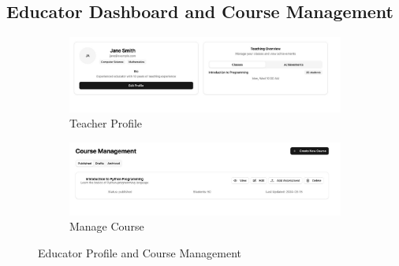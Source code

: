 \documentclass[a4paper, 11pt]{scrreprt}
\begin{document}
\subsection{Educator Dashboard and Course Management}
\begin{figure}[H]
    \centering
    \begin{subfigure}[b]{0.45\textwidth}
        \centering
        \includegraphics[width=\textwidth]{UI/TeacherProfile.jpg}
        \caption{Teacher Profile}
    \end{subfigure}
    \hfill
    \begin{subfigure}[b]{0.45\textwidth}
        \centering
        \includegraphics[width=\textwidth]{UI/TeacherManageCourse.jpg}
        \caption{Manage Course}
    \end{subfigure}
    \caption{Educator Profile and Course Management}
\end{figure}
\end{document}
